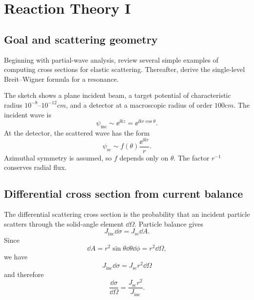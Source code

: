 \chapter{Reaction Theory I}

\section{Goal and scattering geometry}
Beginning with partial-wave analysis, review several simple examples of computing cross sections for elastic scattering.  Thereafter, derive the single-level Breit--Wigner formula for a resonance.

The sketch shows a plane incident beam, a target potential of characteristic radius $10^{-8}$--$10^{-12}\unit{cm}$, and a detector at a macroscopic radius of order $100\unit{cm}$.  The incident wave is
\begin{equation*}
  \psi_{\mathrm{inc}}\sim \ee^{\ii kz}=\ee^{\ii kr\cos\theta}.
  \tag{1}
\end{equation*}
At the detector, the scattered wave has the form
\begin{equation*}
  \psi_{\mathrm{sc}}\sim f(\theta)\frac{\ee^{\ii kr}}{r}.
  \tag{2}
\end{equation*}
Azimuthal symmetry is assumed, so $f$ depends only on $\theta$.  The factor $r^{-1}$ conserves radial flux.

\section{Differential cross section from current balance}
The differential scattering cross section is the probability that an incident particle scatters through the solid-angle element $\dd\Omega$.  Particle balance gives
\begin{equation*}
  J_{\mathrm{inc}}\dd\sigma=J_{\mathrm{sc}}\dd A.
  \tag{3}
\end{equation*}
Since
\begin{equation*}
  \dd A=r^2\sin\theta\dd\theta\dd\phi=r^2\dd\Omega,
  \tag{4}
\end{equation*}
we have
\[
  J_{\mathrm{inc}}\dd\sigma=J_{\mathrm{sc}}r^2\dd\Omega
\]
and therefore
\begin{equation*}
  \frac{\dd\sigma}{\dd\Omega}
  =\frac{J_{\mathrm{sc}}r^2}{J_{\mathrm{inc}}}.
  \tag{5}
\end{equation*}

